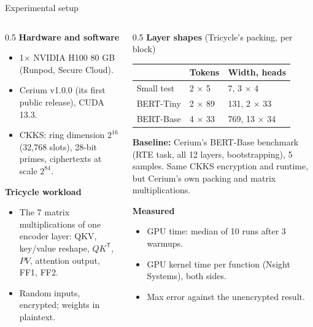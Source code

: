\documentclass[aspectratio=169]{beamer}
\begin{document}
\begin{frame}{Experimental setup}
\footnotesize
\begin{columns}[T]
\begin{column}{0.5\textwidth}
\textbf{Hardware and software}
\begin{itemize}\footnotesize
  \item 1$\times$ NVIDIA H100 80 GB (Runpod, Secure Cloud).
  \item Cerium v1.0.0 (its first public release), CUDA 13.3.
  \item CKKS: ring dimension $2^{16}$ (32{,}768 slots), 28-bit primes, ciphertexts at scale $2^{84}$.
\end{itemize}
\vspace{0.3em}
\textbf{Tricycle workload}
\begin{itemize}\footnotesize
  \item The 7 matrix multiplications of one encoder layer: QKV, key/value reshape, $QK^{\mathsf T}$, $PV$, attention output, FF1, FF2.
  \item Random inputs, encrypted; weights in plaintext.
\end{itemize}
\end{column}
\begin{column}{0.5\textwidth}
\textbf{Layer shapes} (Tricycle's packing, per block)
\begin{center}
\begin{tabular}{@{}lll@{}}
\toprule
& \textbf{Tokens} & \textbf{Width, heads}\\
\midrule
Small test & 2 $\times$ 5 & 7, 3 $\times$ 4\\
BERT-Tiny & 2 $\times$ 89 & 131, 2 $\times$ 33\\
BERT-Base & 4 $\times$ 33 & 769, 13 $\times$ 34\\
\bottomrule
\end{tabular}
\end{center}
\textbf{Baseline:} Cerium's BERT-Base benchmark (RTE task, all 12 layers, bootstrapping), 5 samples. Same CKKS encryption and runtime, but Cerium's own packing and matrix multiplications.
\vspace{0.3em}

\textbf{Measured}
\begin{itemize}\footnotesize
  \item GPU time: median of 10 runs after 3 warmups.
  \item GPU kernel time per function (Nsight Systems), both sides.
  \item Max error against the unencrypted result.
\end{itemize}
\end{column}
\end{columns}
\end{frame}
\end{document}
